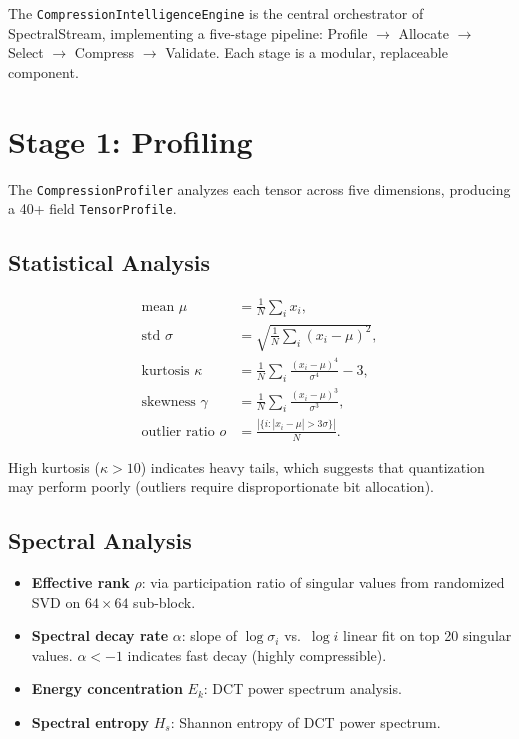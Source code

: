 \documentclass[11pt,a4paper,openright]{book}
\begin{document}
The \texttt{CompressionIntelligenceEngine} is the central orchestrator of SpectralStream, implementing a five-stage pipeline: Profile $\to$ Allocate $\to$ Select $\to$ Compress $\to$ Validate. Each stage is a modular, replaceable component.

\section{Stage 1: Profiling}

The \texttt{CompressionProfiler} analyzes each tensor across five dimensions, producing a 40+ field \texttt{TensorProfile}.

\subsection{Statistical Analysis}

\begin{align}
	\text{mean } \mu        & = \frac{1}{N}\sum_i x_i,                                \\
	\text{std } \sigma      & = \sqrt{\frac{1}{N}\sum_i (x_i - \mu)^2},               \\
	\text{kurtosis } \kappa & = \frac{1}{N}\sum_i \frac{(x_i - \mu)^4}{\sigma^4} - 3, \\
	\text{skewness } \gamma & = \frac{1}{N}\sum_i \frac{(x_i - \mu)^3}{\sigma^3},     \\
	\text{outlier ratio } o & = \frac{|\{i: |x_i - \mu| > 3\sigma\}|}{N}.
\end{align}

High kurtosis ($\kappa > 10$) indicates heavy tails, which suggests that quantization may perform poorly (outliers require disproportionate bit allocation).

\subsection{Spectral Analysis}

\begin{itemize}
	\item \textbf{Effective rank} $\rho$: via participation ratio of singular values from randomized SVD on $64 \times 64$ sub-block.
	\item \textbf{Spectral decay rate} $\alpha$: slope of $\log \sigma_i$ vs.\ $\log i$ linear fit on top 20 singular values. $\alpha < -1$ indicates fast decay (highly compressible).
	\item \textbf{Energy concentration} $E_k$: DCT power spectrum analysis.
	\item \textbf{Spectral entropy} $H_s$: Shannon entropy of DCT power spectrum.
\end{itemize}
\end{document}

